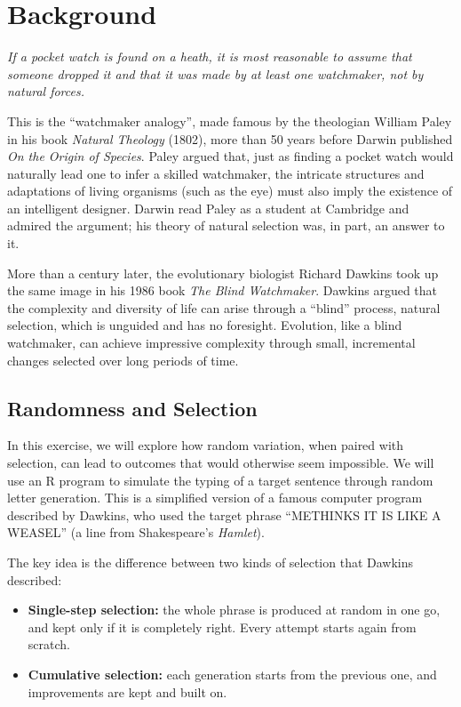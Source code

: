 \documentclass[
  a4paper]{book}
\providecommand{\tightlist}{%
  \setlength{\itemsep}{0pt}\setlength{\parskip}{0pt}}
\begin{document}
\section{Background}\label{background}

\emph{If a pocket watch is found on a heath, it is most reasonable to assume that someone dropped it and that it was made by at least one watchmaker, not by natural forces.}

This is the ``watchmaker analogy'', made famous by the theologian William Paley in his book \emph{Natural Theology} (1802), more than 50 years before Darwin published \emph{On the Origin of Species}. Paley argued that, just as finding a pocket watch would naturally lead one to infer a skilled watchmaker, the intricate structures and adaptations of living organisms (such as the eye) must also imply the existence of an intelligent designer. Darwin read Paley as a student at Cambridge and admired the argument; his theory of natural selection was, in part, an answer to it.

More than a century later, the evolutionary biologist Richard Dawkins took up the same image in his 1986 book \emph{The Blind Watchmaker}. Dawkins argued that the complexity and diversity of life can arise through a ``blind'' process, natural selection, which is unguided and has no foresight. Evolution, like a blind watchmaker, can achieve impressive complexity through small, incremental changes selected over long periods of time.

\subsection{Randomness and Selection}\label{randomness-and-selection}

In this exercise, we will explore how random variation, when paired with selection, can lead to outcomes that would otherwise seem impossible. We will use an R program to simulate the typing of a target sentence through random letter generation. This is a simplified version of a famous computer program described by Dawkins, who used the target phrase ``METHINKS IT IS LIKE A WEASEL'' (a line from Shakespeare's \emph{Hamlet}).

The key idea is the difference between two kinds of selection that Dawkins described:

\begin{itemize}
\tightlist
\item
  \textbf{Single-step selection:} the whole phrase is produced at random in one go, and kept only if it is completely right. Every attempt starts again from scratch.
\item
  \textbf{Cumulative selection:} each generation starts from the previous one, and improvements are kept and built on.
\end{itemize}
\end{document}
